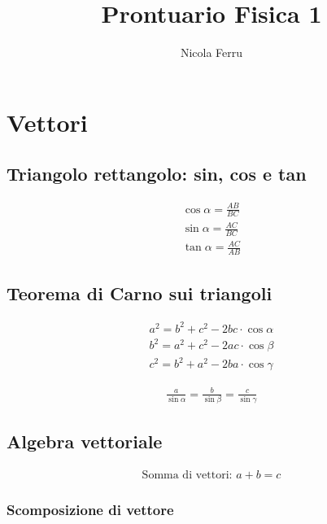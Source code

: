 \documentclass{article}
\title{Prontuario Fisica 1}
\author{Nicola Ferru}
\begin{document}
\maketitle

\section{Vettori}
\label{sec:vect}

\subsection{Triangolo rettangolo: sin, cos e tan}
\label{sec:triangoretsincosetan}
\begin{eqnarray}
  \label{eq:sincostan}
  \cos \alpha = \frac{AB}{BC}\\
  \sin \alpha = \frac{AC}{BC}\\
  \tan \alpha = \frac{AC}{AB}
\end{eqnarray}

\subsection{Teorema di Carno sui triangoli}
\label{sec:carnoetriang}

\begin{eqnarray}
  \label{eq:teoremadicarnot}
  a^2=b^2+c^2-2bc\cdot \cos\alpha\\
  b^2=a^2+c^2-2ac \cdot \cos \beta\\
  c^2=b^2+a^2-2ba\cdot \cos \gamma
\end{eqnarray}

\label{teorseni}

\begin{eqnarray}
  \label{eq:sin}
  \frac{a}{\sin \alpha} = \frac{b}{\sin \beta} = \frac{c}{\sin \gamma}
\end{eqnarray}

\subsection{Algebra vettoriale}
\label{sec:algvett}

\begin{eqnarray}
  \label{eq:algvet}
  \text{Somma di vettori: } a+b=c
\end{eqnarray}

\subsubsection{Scomposizione di vettore }
\label{sec:scomposizione}
\end{document}

